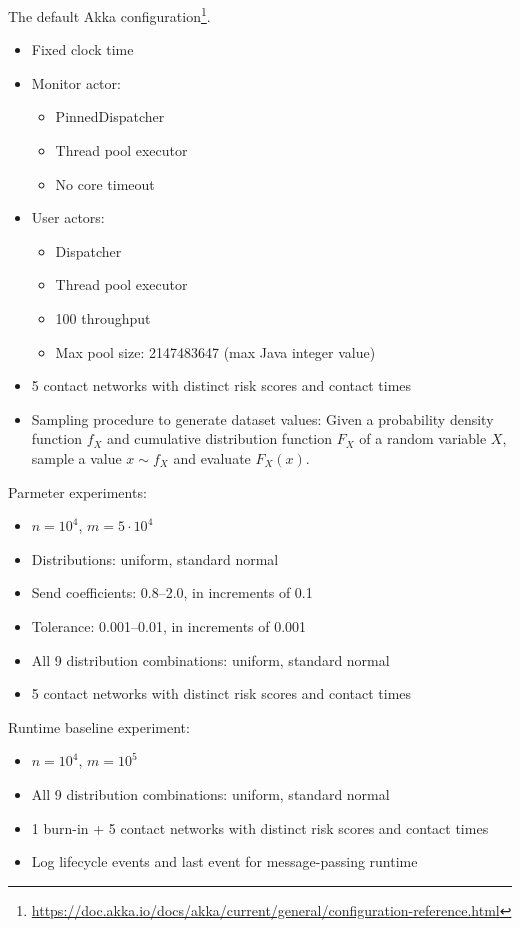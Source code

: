 The default Akka configuration\footnote{\url{https://doc.akka.io/docs/akka/current/general/configuration-reference.html}}.

\begin{itemize}
  \item Fixed clock time
  \item Monitor actor:
    \begin{itemize}
      \item PinnedDispatcher
      \item Thread pool executor 
      \item No core timeout
    \end{itemize}
  \item User actors:
    \begin{itemize}
      \item Dispatcher
      \item Thread pool executor
      \item \num{100} throughput
      \item Max pool size: \num{2147483647} (max Java integer value)
    \end{itemize}
  \item 5 contact networks with distinct risk scores and contact times
  \item Sampling procedure to generate dataset values: Given a probability density function $f_X$ and cumulative distribution function $F_X$ of a random variable $X$, sample a value $x \sim f_X$ and evaluate $F_X(x)$.
\end{itemize}

Parmeter experiments:

\begin{itemize}
  \item $n = 10^4$, $m = 5 \cdot 10^4$
  \item Distributions: uniform, standard normal
  \item Send coefficients: 0.8–2.0, in increments of 0.1
  \item Tolerance: 0.001–0.01, in increments of 0.001
  \item All 9 distribution combinations: uniform, standard normal
  \item 5 contact networks with distinct risk scores and contact times
\end{itemize}

Runtime baseline experiment:

\begin{itemize}
  \item $n = 10^4$, $m = 10^5$
  \item All 9 distribution combinations: uniform, standard normal
  \item 1 burn-in + 5 contact networks with distinct risk scores and contact times
  \item Log lifecycle events and last event for message-passing runtime
\end{itemize}

